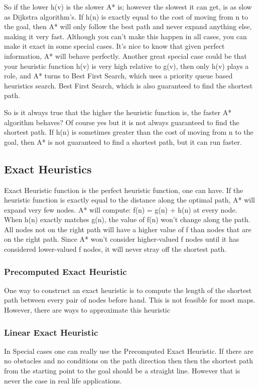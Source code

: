 \documentclass[12pt]{article}
\begin{document}
So if the lower h(v) is the slower A* is; however the slowest it can get, is as slow as Dijkstra algorithm's. If h(n) is exactly equal to the cost of moving from n to the goal, then A* will only follow the best path and never expand anything else, making it very fast. Although you can’t make this happen in all cases, you can make it exact in some special cases. It’s nice to know that given perfect information, A* will behave perfectly. Another great special case could be that your heuristic function h(v) is very high relative to g(v), then only h(v) plays a role, and A* turns to Best First Search, which uses a priority queue based heuristics search. Best First Search, which is also guaranteed to find the shortest path.

So is it always true that the higher the heuristic function is, the faster A* algorithm behaves? Of course yes but it is not always guaranteed to find the shortest path. If h(n) is sometimes greater than the cost of moving from n to the goal, then A* is not guaranteed to find a shortest path, but it can run faster.

\subsection{Exact Heuristics}
Exact Heuristic function is the perfect heuristic function, one can have. If the heuristic function is exactly equal to the distance along the optimal path, A* will expand very few nodes. A* will compute:  f(n) = g(n) + h(n) at every node. When h(n) exactly matches g(n), the value of f(n) won't change along the path. All nodes not on the right path will have a higher value of f than nodes that are on the right path. Since A* won't consider higher-valued f nodes until it has considered lower-valued f nodes, it will never stray off the shortest path.

\subsubsection{Precomputed Exact Heuristic}
One way to construct an exact heuristic is to compute the length of the shortest path between every pair of nodes before hand. This is not feasible for most maps. However, there are ways to approximate this heuristic

\subsubsection{Linear Exact Heuristic}
In Special cases one can really use the Precomputed Exact Heuristic. If there are no obstacles and no conditions on the path direction then then the shortest path from the starting point to the goal should be a straight line. However that is never the case in real life applications.
\end{document}
